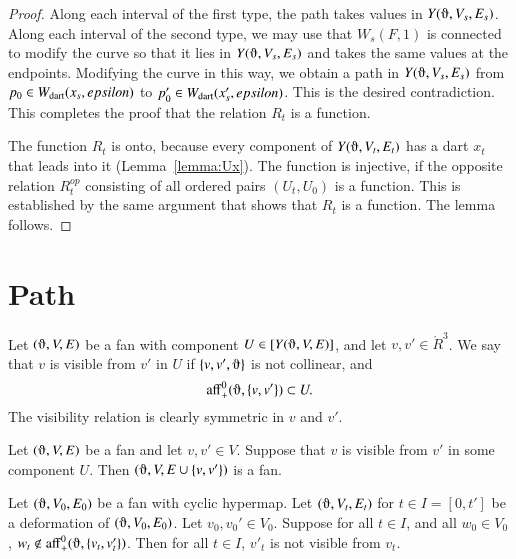 \begin{proof}
Along each interval of the first type, the path takes values in
$Y(\orgn,V_s,E_s)$.  Along each interval of the second type,
we may use that $W_s(F,1)$ is connected to modify
the curve so that it lies in $Y(\orgn,V_s,E_s)$ and takes
the same values at the endpoints.  Modifying the curve in this way,
we obtain a path in $Y(\orgn,V_s,E_s)$
from $p_0\in W_{\text{dart}}(x_s,epsilon)$ to $p'_0\in W_{\text{dart}}(x'_s,epsilon)$.  This is the desired
contradiction.  This completes
the proof that the relation $R_t$ is a function.

The function $R_t$ is onto, because every component of $Y(\orgn,V_t,E_t)$
has a dart $x_t$ that leads into it (Lemma~\ref{lemma:Ux}).  The function is injective,
if the opposite relation $R_t^{op}$ consisting of all ordered pairs
$(U_t,U_0)$ is a function.  This is established by the same argument
that shows that $R_t$ is a function.  The lemma follows. 
\end{proof}

%

\section{Path} %


\begin{definition}[visible]
Let $(\orgn,V,E)$ be a fan with component $U\in \comp{Y(\orgn,V,E)}$, 
and let $v,v'\in \ring{R}^3$.  We say
that $v$ is visible from $v'$ in $U$ 
if $\{v,v',\orgn\}$ is not
collinear,  and
  $$\op{aff}_+^0(\orgn,\{v,v'\})\subset U.$$
The visibility relation is clearly symmetric in $v$ and $v'$.
\end{definition}



\begin{lemma} 
Let $(\orgn,V,E)$ be a fan and let $v,v'\in V$.
Suppose that $v$ is visible from $v'$ in some component $U$.  
Then
$(\orgn,V,E\cup\{v,v'\})$ is a fan.
\end{lemma}



\begin{lemma}  
Let $(\orgn,V_0,E_0)$ be a fan with cyclic hypermap.  Let $(\orgn,V_t,E_t)$
for $t\in I = [0,t']$ be a deformation of $(\orgn,V_0,E_0)$. 
Let $v_0,v_0'\in V_0$.  Suppose for all $t\in I$, and all $w_0\in V_0$,
$w_t\not\in \op{aff}_+^0(\orgn,\{v_t,v_t'\})$.
Then for all $t\in I$, $v'_t$ is not visible from $v_t$.
\end{lemma}

